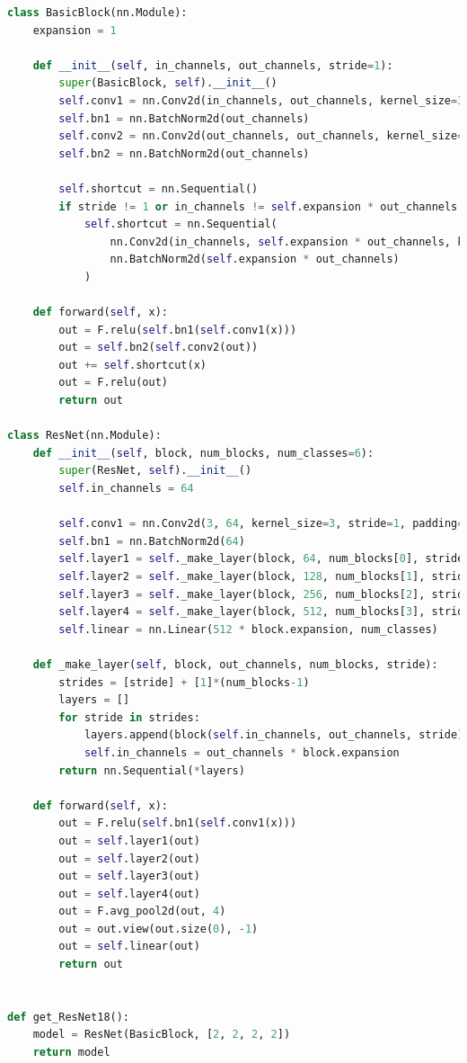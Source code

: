 \documentclass[twocolumn]{article}
\begin{document}
\begin{lstlisting}[language=Python, caption=ResNet Model Code]
    class BasicBlock(nn.Module):
    expansion = 1

    def __init__(self, in_channels, out_channels, stride=1):
        super(BasicBlock, self).__init__()
        self.conv1 = nn.Conv2d(in_channels, out_channels, kernel_size=3, stride=stride, padding=1, bias=False)
        self.bn1 = nn.BatchNorm2d(out_channels)
        self.conv2 = nn.Conv2d(out_channels, out_channels, kernel_size=3, stride=1, padding=1, bias=False)
        self.bn2 = nn.BatchNorm2d(out_channels)

        self.shortcut = nn.Sequential()
        if stride != 1 or in_channels != self.expansion * out_channels:
            self.shortcut = nn.Sequential(
                nn.Conv2d(in_channels, self.expansion * out_channels, kernel_size=1, stride=stride, bias=False),
                nn.BatchNorm2d(self.expansion * out_channels)
            )

    def forward(self, x):
        out = F.relu(self.bn1(self.conv1(x)))
        out = self.bn2(self.conv2(out))
        out += self.shortcut(x)
        out = F.relu(out)
        return out

class ResNet(nn.Module):
    def __init__(self, block, num_blocks, num_classes=6):
        super(ResNet, self).__init__()
        self.in_channels = 64

        self.conv1 = nn.Conv2d(3, 64, kernel_size=3, stride=1, padding=1, bias=False)
        self.bn1 = nn.BatchNorm2d(64)
        self.layer1 = self._make_layer(block, 64, num_blocks[0], stride=1)
        self.layer2 = self._make_layer(block, 128, num_blocks[1], stride=2)
        self.layer3 = self._make_layer(block, 256, num_blocks[2], stride=2)
        self.layer4 = self._make_layer(block, 512, num_blocks[3], stride=2)
        self.linear = nn.Linear(512 * block.expansion, num_classes)

    def _make_layer(self, block, out_channels, num_blocks, stride):
        strides = [stride] + [1]*(num_blocks-1)
        layers = []
        for stride in strides:
            layers.append(block(self.in_channels, out_channels, stride))
            self.in_channels = out_channels * block.expansion
        return nn.Sequential(*layers)

    def forward(self, x):
        out = F.relu(self.bn1(self.conv1(x)))
        out = self.layer1(out)
        out = self.layer2(out)
        out = self.layer3(out)
        out = self.layer4(out)
        out = F.avg_pool2d(out, 4)
        out = out.view(out.size(0), -1)
        out = self.linear(out)
        return out


def get_ResNet18():
    model = ResNet(BasicBlock, [2, 2, 2, 2])
    return model
\end{lstlisting}
\end{document}
